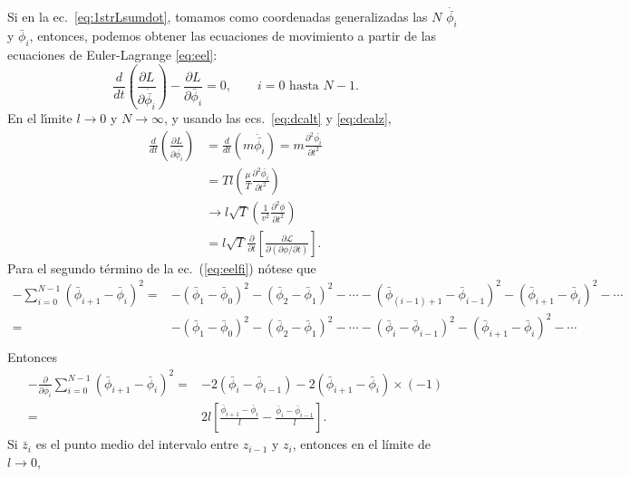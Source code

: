 Si en la ec.~\eqref{eq:1strLsumdot}, tomamos como coordenadas
generalizadas las $N$ $\dot{\bar{\phi_i}}$ y $\bar\phi_i$, entonces, podemos
obtener las ecuaciones de movimiento a partir de las ecuaciones de
Euler-Lagrange \eqref{eq:eel}:
\begin{equation}
  \label{eq:eelfi}
   \frac{d}{dt} \left ( \frac{\partial L}{\partial\dot{\bar{\phi_i}}} \right ) -
   \frac{\partial L}{\partial \bar\phi_i} = 0,
\qquad \text{$i=0$ hasta $N-1$}.
\end{equation}
En el l\'\i mite $l\to0$ y $N\to\infty$, y usando las ecs.~\eqref{eq:dcalt} 
y \eqref{eq:dcalz}, %
\begin{align}
  \label{eq:emov1}
  \frac{d}{dt} \left( \frac{\partial L}{\partial\dot{\bar{\phi_i}}} \right)
  &=\frac{d}{dt} \left( m\dot{\bar{\phi_i}} \right)
= m\frac{\partial^2\bar{\phi_i}}{\partial t^2} \nonumber\\
&= T l\left(\frac{\mu}{T}\frac{\partial^2\bar{\phi_i}}{\partial t^2} \right)\nonumber\\
  &\to
  l\sqrt{T}
  \left(
    \frac{1}{v^2}\frac{\partial^2\phi}{\partial t^2}
  \right)\\
  \label{eq:eecalt} %
  &=l\sqrt{T}\frac{\partial}{\partial t}
  \left[
    \frac{\partial\mathcal{L}}{\partial
      (\partial\phi/\partial t)}
  \right].
\end{align}
Para el segundo t\'ermino de la ec.~(\ref{eq:eelfi}) n\'otese que
\begin{align}
- \sum_{i=0}^{N-1}\left(\bar\phi_{i+1}-\bar\phi_{i}\right)^2= 
 &-\left(\bar\phi_{1}-\bar\phi_{0}\right)^2-\left(\bar\phi_{2}-\bar\phi_{1}\right)^2-\cdots
-\left(\bar\phi_{(i-1)+1}-\bar\phi_{i-1}\right)^2-\left(\bar\phi_{i+1}-\bar\phi_{i}\right)^2-\cdots\nonumber\\
 =&-\left(\bar\phi_{1}-\bar\phi_{0}\right)^2-\left(\bar\phi_{2}-\bar\phi_{1}\right)^2-\cdots
 -\left(\bar\phi_{i}-\bar\phi_{i-1}\right)^2-\left(\bar\phi_{i+1}-\bar\phi_{i}\right)^2-\cdots\nonumber\\
\end{align}
Entonces
\begin{align}
-\frac{\partial}{\partial\bar\phi_i}  \sum_{i=0}^{N-1}\left(\bar\phi_{i+1}-\bar\phi_{i}\right)^2
=&-2\left(\bar\phi_{i}-\bar\phi_{i-1}\right)-2\left(\bar\phi_{i+1}-\bar\phi_{i}\right)\times(-1)\nonumber\\
=&2l\left[\frac{\bar\phi_{i+1}-\bar\phi_{i}}{l}-\frac{\bar\phi_{i}-\bar\phi_{i-1}}{l}\right].\nonumber
\end{align}
Si $\bar{z}_i$ es el punto medio del intervalo entre $z_{i-1}$ y $z_i$, entonces en el límite de $l\to0$,

